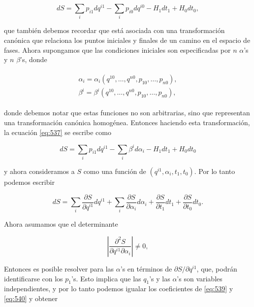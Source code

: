 \documentclass[a4paper,10pt]{article}
\numberwithin{equation}{section}
\begin{document}
\begin{equation}
 dS = \sum_i p_{i1}dq^{i1} - \sum_i p_{i0}dq^{i0} - H_1 dt_1 + 
 H_0 dt_0,
 \label{eq:537}
\end{equation}

que también debemos recordar que está asociada con una transformación 
canónica que relaciona los puntos iniciales y finales de un camino 
en el espacio de fases. Ahora supongamos que las condiciones iniciales 
son especificadas por $n$ $\alpha$'s y $n$ $\beta$'s, donde 

\begin{align}
 \begin{split}
  \alpha_i = \alpha_i(q^{10},\dots,q^{n0}, p_{10}, \dots, p_{n0}), \\
  \beta^i = \beta^i(q^{10},\dots,q^{n0}, p_{10}, \dots, p_{n0}),
 \end{split}
\end{align}

donde debemos notar que estas funciones no son arbitrarias, sino que 
representan una transformación canónica homogénea. Entonces haciendo 
esta transformación, la ecuación \eqref{eq:537} se escribe como 

\begin{equation}
 dS = \sum_i p_{i1}dq^{i1} - \sum_i \beta^id\alpha_i - H_1 dt_1 + 
 H_0 dt_0
 \label{eq:539}
\end{equation}

y ahora consideramos a $S$ como una función de $(q^{i1},\alpha_i,t_1,t_0)$. 
Por lo tanto podemos escribir 

\begin{equation}
 dS = \sum_i \frac{\partial S}{\partial q^{i1}}dq^{i1} + 
 \sum_i \frac{\partial S}{\partial \alpha_i}d\alpha_i + 
 \frac{\partial S}{\partial t_1}dt_1 + 
 \frac{\partial S}{\partial t_0}dt_0.
 \label{eq:540}
\end{equation}

Ahora asumamos que el determinante 

\begin{equation}
 \left|\frac{\partial^2 S}{\partial q^{i1}\partial \alpha_i} \right| 
 \ne 0,
\end{equation}

Entonces es posible resolver para las $\alpha$'s en términos de 
$\partial S/\partial q^{i1}$, que, podrán identificarse con los 
$p_1$'s. Esto implica que las $q_1$'s y las $\alpha$'s son variables 
independientes, y por lo tanto podemos igualar los coeficientes 
de \eqref{eq:539} y \eqref{eq:540} y obtener 
\end{document}
